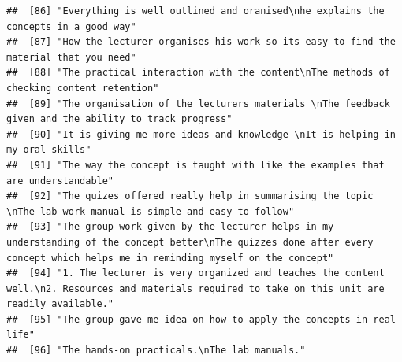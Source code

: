 \documentclass[
]{article}
\begin{document}
\begin{verbatim}
##  [86] "Everything is well outlined and oranised\nhe explains the concepts in a good way"                                                                                                                                                                 
##  [87] "How the lecturer organises his work so its easy to find the material that you need"                                                                                                                                                               
##  [88] "The practical interaction with the content\nThe methods of checking content retention"                                                                                                                                                            
##  [89] "The organisation of the lecturers materials \nThe feedback given and the ability to track progress"                                                                                                                                               
##  [90] "It is giving me more ideas and knowledge \nIt is helping in my oral skills"                                                                                                                                                                       
##  [91] "The way the concept is taught with like the examples that are understandable"                                                                                                                                                                     
##  [92] "The quizes offered really help in summarising the topic \nThe lab work manual is simple and easy to follow"                                                                                                                                       
##  [93] "The group work given by the lecturer helps in my understanding of the concept better\nThe quizzes done after every concept which helps me in reminding myself on the concept"                                                                     
##  [94] "1. The lecturer is very organized and teaches the content well.\n2. Resources and materials required to take on this unit are readily available."                                                                                                 
##  [95] "The group gave me idea on how to apply the concepts in real life"                                                                                                                                                                                 
##  [96] "The hands-on practicals.\nThe lab manuals."                                                                                                                                                                                                       

\end{verbatim}
\end{document}
